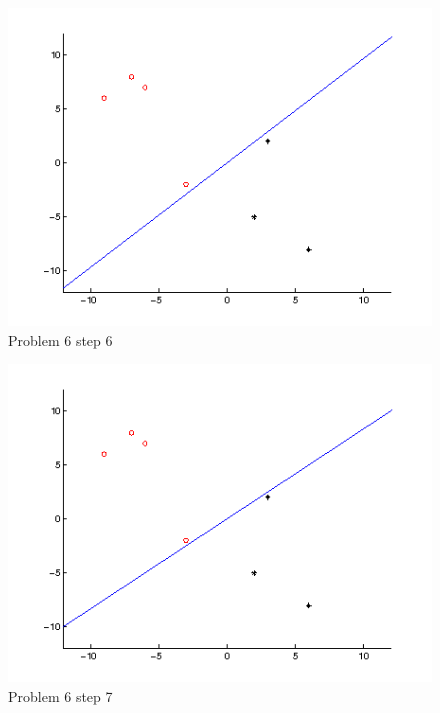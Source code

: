 \begin{figure}
\centering{}\includegraphics[width=1\textwidth]{plots/6_6}\caption{Problem 6 step 6}
\end{figure}
\begin{figure}
\centering{}\includegraphics[width=1\textwidth]{plots/6_7}\caption{Problem 6 step 7}
\end{figure}
